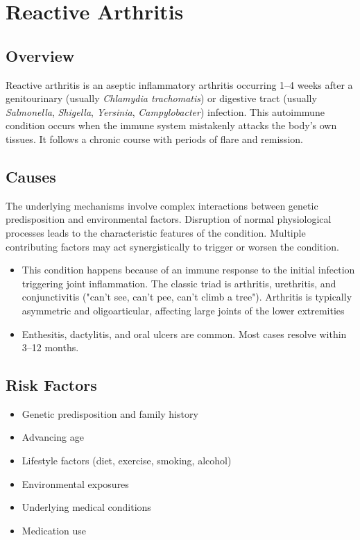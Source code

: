 \chapter{Reactive Arthritis}
\label{sec:Reactive Arthritis}

\section{Overview}
Reactive arthritis is an aseptic inflammatory arthritis occurring 1--4 weeks after a genitourinary (usually \textit{Chlamydia trachomatis}) or digestive tract (usually \textit{Salmonella}, \textit{Shigella}, \textit{Yersinia}, \textit{Campylobacter}) infection. This autoimmune condition occurs when the immune system mistakenly attacks the body's own tissues. It follows a chronic course with periods of flare and remission.
\section{Causes}
The underlying mechanisms involve complex interactions between genetic predisposition and environmental factors. Disruption of normal physiological processes leads to the characteristic features of the condition. Multiple contributing factors may act synergistically to trigger or worsen the condition.

\begin{itemize}[noitemsep]
  \item This condition happens because of an immune response to the initial infection triggering joint inflammation. The classic triad is arthritis, urethritis, and conjunctivitis ("can't see, can't pee, can't climb a tree"). Arthritis is typically asymmetric and oligoarticular, affecting large joints of the lower extremities
  \item Enthesitis, dactylitis, and oral ulcers are common. Most cases resolve within 3--12 months.
\end{itemize}
\section{Risk Factors}


\begin{itemize}[noitemsep]
  \item Genetic predisposition and family history
  \item Advancing age
  \item Lifestyle factors (diet, exercise, smoking, alcohol)
  \item Environmental exposures
  \item Underlying medical conditions
  \item Medication use
\end{itemize}
